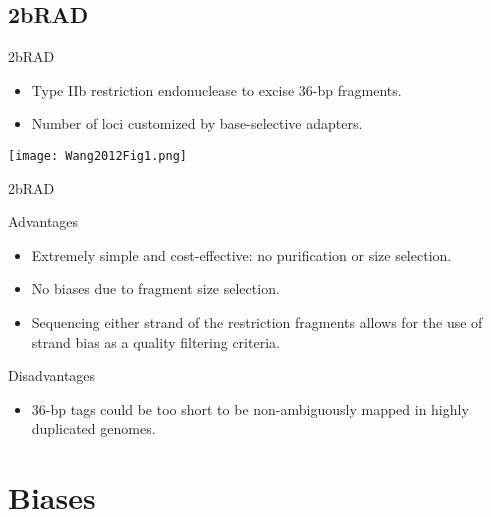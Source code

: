 \documentclass[presentation]{beamer}
\begin{document}
\subsection{2bRAD}
\label{sec:org8f0dd94}
\begin{frame}[label={sec:orgf8f67a2}]{2bRAD \citep{Wang2012}}
\begin{itemize}
\item Type IIb restriction endonuclease to excise 36-bp fragments.
\item Number of loci customized by base-selective adapters.
\end{itemize}

\begin{latex}
\begin{center}
\end{latex}
\begin{center}
\texttt{[image: Wang2012Fig1.png]}
\end{center}


\end{frame}

\begin{frame}[label={sec:org3b15c9d}]{2bRAD \citep{Wang2012}}
\begin{block}{Advantages}
\begin{itemize}
\item Extremely simple and cost-effective: no purification or size selection.
\item No biases due to fragment size selection.
\item Sequencing either strand of the restriction fragments allows for the
use of strand bias as a quality filtering criteria.
\end{itemize}
\end{block}
\begin{block}{Disadvantages}
\begin{itemize}
\item 36-bp tags could be too short to be non-ambiguously mapped in highly
duplicated genomes.
\end{itemize}
\end{block}
\end{frame}
\section{Biases}
\label{sec:org8cc17fd}
\end{document}
